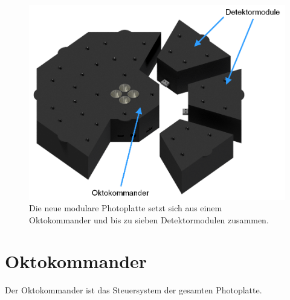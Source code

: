 \documentclass{sciposter}
\begin{document}
\begin{multicols}{3}
\begin{figure}[h]
	\centering
	\includegraphics[scale=1.25]{../CAD_Bilder/Gestikulaser/Gestikulaser_beschriftet.png}
	\caption{Die neue modulare Photoplatte setzt sich aus einem Oktokommander und bis zu sieben Detektormodulen zusammen.}
	\label{fig:PhotoplatteAlpha}
\end{figure}


\section{Oktokommander}
\noindent
Der Oktokommander ist das Steuersystem der gesamten Photoplatte. %


\end{multicols}
\end{document}
